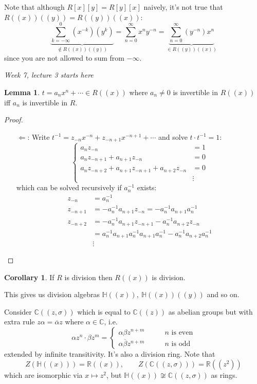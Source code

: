 \documentclass[a4paper]{article}
\newcommand{\R}{\mathbb{R}}
\newcommand{\C}{\mathbb{C}}
\newcommand{\Hq}{\mathbb{H}}
\theoremstyle{definition}
\newtheorem{lemma}[defn]{Lemma}
\newtheorem{coro}[defn]{Corollary}
\begin{document}
Note that although $R[x][y]=R[y][x]$ naively, it's not true that $R((x))((y))=R((y))((x))$:
\[
\underbrace{\sum_{k=-\infty}^0 (x^{-k})(y^k)}_{\notin R((x))((y))}=\sum_{n=0}^\infty x^n y^{-n}=\underbrace{\sum_{n=0}^\infty (y^{-n})x^n}_{\in R((y))((x))}
\]
since you are not allowed to sum from $-\infty$.

\begin{flushright}
\textit{Week 7, lecture 3 starts here}
\end{flushright}

\begin{lemma}
$t=a_nx^n+\cdots\in R((x))$ where $a_n\neq 0$ is invertible in $R((x))$ iff $a_n$ is invertible in $R$.
\end{lemma}
\begin{proof}[Proof]
\begin{itemize}
\item[$\Leftarrow$:] Write $t^{-1}=z_{-n}x^{-n}+z_{-n+1}x^{-n+1}+\cdots$ and solve $t\cdot t^{-1}=1$:
\[
\left\{\begin{aligned}
a_n z_{-n}&=1\\
a_n z_{-n+1}+a_{n+1}z_{-n}&=0\\
a_n z_{-n+2}+a_{n+1}z_{-n+1}+a_{n+2}z_{-n}&=0\\
&\vdots
\end{aligned} \right.
\]
which can be solved recursively if $a_n^{-1}$ exists:
\[
\begin{aligned}
z_{-n}&=a_n^{-1}\\
z_{-n+1}&=-a_n^{-1}a_{n+1}z_{-n}=-a_n^{-1}a_{n+1}a_n^{-1}\\
z_{-n+2}&=-a_n^{-1}a_{n+1}z_{-n+1}-a_n^{-1}a_{n+2}z_{-n}\\
&=a_n^{-1}a_{n+1}a_n^{-1}a_{n+1}a_n^{-1}-a_n^{-1}a_{n+2}a_n^{-1} \\
&\vdots
\end{aligned}
\]
\end{itemize}
\end{proof}

\begin{coro}
If $R$ is division then $R((x))$ is division.
\end{coro}
This gives us division algebras $\Hq((x)),\ \Hq((x))((y))$ and so on.

Consider $\C((z,\sigma))$ which is equal to $\C((z))$ as abelian groups but with extra rule $z\alpha=\overline\alpha z$ where $\alpha\in\C$, i.e.
\[
\alpha z^n \cdot \beta z^m=\left\{ \begin{aligned}
\alpha\beta z^{n+m}\qquad &n\text{ is even} \\ \alpha\overline\beta z^{n+m}\qquad &n\text{ is odd}
\end{aligned} \right.
\]
extended by infinite transitivity. It's also a division ring. Note that
\[
Z(\Hq((x)))=\R((x)),\qquad Z(\C((z,\sigma)))=\R((z^2))
\]
which are isomorphic via $x\mapsto z^2$, but $\Hq((x))\not\cong \C((z,\sigma))$ as rings.
\end{document}
